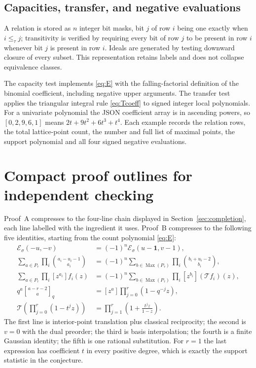 \documentclass[11pt]{article}
\numberwithin{equation}{section}
\theoremstyle{definition}
\theoremstyle{remark}
\newcommand{\one}{\mathbf 1}
\newcommand{\Max}{\operatorname{Max}}
\newcommand{\Ecal}{\mathcal E}
\newcommand{\Tr}{\mathcal T}
\newcommand{\qbinom}[2]{\genfrac{[}{]}{0pt}{}{#1}{#2}_{q}}
\begin{document}
\subsection{Capacities, transfer, and negative evaluations}

A relation is stored as $n$ integer bit masks, bit $j$ of row $i$ being one
exactly when $i\le_\tau j$; transitivity is verified by requiring every bit of
row $j$ to be present in row $i$ whenever bit $j$ is present in row $i$.
Ideals are generated by testing downward closure of every subset. This
representation retains labels and does not collapse equivalence classes.

The capacity test implements \eqref{eq:E} with the falling-factorial
definition of the binomial coefficient, including negative upper arguments.
The transfer test applies the triangular integral rule \eqref{eq:Tcoeff} to
signed integer local polynomials. For a univariate polynomial the JSON
coefficient array is in ascending powers, so $[0,2,9,6,1]$ means
$2t+9t^2+6t^3+t^4$. Each example records the relation rows, the total
lattice-point count, the number and full list of maximal points, the support
polynomial and all four signed negative evaluations.

\section{Compact proof outlines for independent checking}
\label{app:outline}

Proof~A compresses to the four-line chain displayed in
Section~\ref{sec:completion}, each line labelled with the ingredient it uses.
Proof~B compresses to the following five identities, starting from the count
polynomial \eqref{eq:E}:
\begin{align*}
 \Ecal_\sigma(-u,-v)
  &=(-1)^n\Ecal_\sigma(u-\one,v-1),\\
 \sum_{a\in P_\tau}\prod_i\binom{a_i-u_i-1}{a_i}
  &=(-1)^n\sum_{b\in \Max(P_\tau)}\prod_i\binom{b_i+u_i-2}{b_i},\\
 \sum_{a\in P_\tau}\prod_i[z^{a_i}]f_i(z)
  &=(-1)^n\sum_{b\in \Max(P_\tau)}\prod_i[z^{b_i}](\Tr f_i)(z),\\
 q^a\qbinom{a-r-2}{a}
  &=[z^a]\prod_{j=0}^r(1-q^{-j}z),\\
 \Tr\!\left(\prod_{j=0}^r(1-t^jz)\right)
  &=\prod_{j=1}^r\left(1+\frac{t^jz}{1-z}\right).
\end{align*}
The first line is interior-point translation plus classical reciprocity; the
second is $v=0$ with the dual preorder; the third is basis interpolation; the
fourth is a finite Gaussian identity; the fifth is one rational substitution.
For $r=1$ the last expression has coefficient $t$ in every positive degree,
which is exactly the support statistic in the conjecture.
\end{document}
